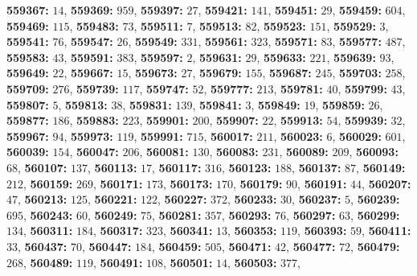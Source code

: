 \textsf{\bfseries 559367:} $14$, \textsf{\bfseries 559369:} $959$, \textsf{\bfseries 559397:} $27$, \textsf{\bfseries 559421:} $141$, \textsf{\bfseries 559451:} $29$, \textsf{\bfseries 559459:} $604$, \textsf{\bfseries 559469:} $115$, \textsf{\bfseries 559483:} $73$, \textsf{\bfseries 559511:} $7$, \textsf{\bfseries 559513:} $82$, \textsf{\bfseries 559523:} $151$, \textsf{\bfseries 559529:} $3$, \textsf{\bfseries 559541:} $76$, \textsf{\bfseries 559547:} $26$, \textsf{\bfseries 559549:} $331$, \textsf{\bfseries 559561:} $323$, \textsf{\bfseries 559571:} $83$, \textsf{\bfseries 559577:} $487$, \textsf{\bfseries 559583:} $43$, \textsf{\bfseries 559591:} $383$, \textsf{\bfseries 559597:} $2$, \textsf{\bfseries 559631:} $29$, \textsf{\bfseries 559633:} $221$, \textsf{\bfseries 559639:} $93$, \textsf{\bfseries 559649:} $22$, \textsf{\bfseries 559667:} $15$, \textsf{\bfseries 559673:} $27$, \textsf{\bfseries 559679:} $155$, \textsf{\bfseries 559687:} $245$, \textsf{\bfseries 559703:} $258$, \textsf{\bfseries 559709:} $276$, \textsf{\bfseries 559739:} $117$, \textsf{\bfseries 559747:} $52$, \textsf{\bfseries 559777:} $213$, \textsf{\bfseries 559781:} $40$, \textsf{\bfseries 559799:} $43$, \textsf{\bfseries 559807:} $5$, \textsf{\bfseries 559813:} $38$, \textsf{\bfseries 559831:} $139$, \textsf{\bfseries 559841:} $3$, \textsf{\bfseries 559849:} $19$, \textsf{\bfseries 559859:} $26$, \textsf{\bfseries 559877:} $186$, \textsf{\bfseries 559883:} $223$, \textsf{\bfseries 559901:} $200$, \textsf{\bfseries 559907:} $22$, \textsf{\bfseries 559913:} $54$, \textsf{\bfseries 559939:} $32$, \textsf{\bfseries 559967:} $94$, \textsf{\bfseries 559973:} $119$, \textsf{\bfseries 559991:} $715$, \textsf{\bfseries 560017:} $211$, \textsf{\bfseries 560023:} $6$, \textsf{\bfseries 560029:} $601$, \textsf{\bfseries 560039:} $154$, \textsf{\bfseries 560047:} $206$, \textsf{\bfseries 560081:} $130$, \textsf{\bfseries 560083:} $231$, \textsf{\bfseries 560089:} $209$, \textsf{\bfseries 560093:} $68$, \textsf{\bfseries 560107:} $137$, \textsf{\bfseries 560113:} $17$, \textsf{\bfseries 560117:} $316$, \textsf{\bfseries 560123:} $188$, \textsf{\bfseries 560137:} $87$, \textsf{\bfseries 560149:} $212$, \textsf{\bfseries 560159:} $269$, \textsf{\bfseries 560171:} $173$, \textsf{\bfseries 560173:} $170$, \textsf{\bfseries 560179:} $90$, \textsf{\bfseries 560191:} $44$, \textsf{\bfseries 560207:} $47$, \textsf{\bfseries 560213:} $125$, \textsf{\bfseries 560221:} $122$, \textsf{\bfseries 560227:} $372$, \textsf{\bfseries 560233:} $30$, \textsf{\bfseries 560237:} $5$, \textsf{\bfseries 560239:} $695$, \textsf{\bfseries 560243:} $60$, \textsf{\bfseries 560249:} $75$, \textsf{\bfseries 560281:} $357$, \textsf{\bfseries 560293:} $76$, \textsf{\bfseries 560297:} $63$, \textsf{\bfseries 560299:} $134$, \textsf{\bfseries 560311:} $184$, \textsf{\bfseries 560317:} $323$, \textsf{\bfseries 560341:} $13$, \textsf{\bfseries 560353:} $119$, \textsf{\bfseries 560393:} $59$, \textsf{\bfseries 560411:} $33$, \textsf{\bfseries 560437:} $70$, \textsf{\bfseries 560447:} $184$, \textsf{\bfseries 560459:} $505$, \textsf{\bfseries 560471:} $42$, \textsf{\bfseries 560477:} $72$, \textsf{\bfseries 560479:} $268$, \textsf{\bfseries 560489:} $119$, \textsf{\bfseries 560491:} $108$, \textsf{\bfseries 560501:} $14$, \textsf{\bfseries 560503:} $377$, 

